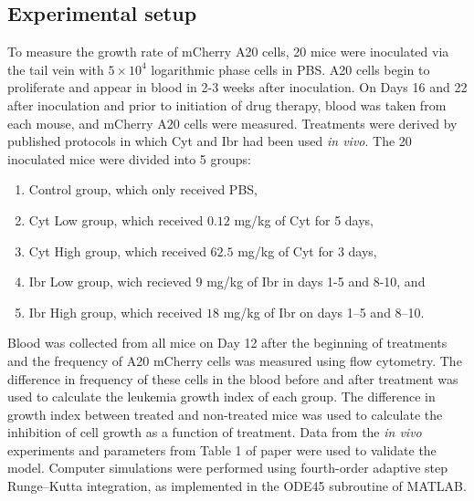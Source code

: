 \subsection{Experimental setup}
To measure the growth rate of mCherry A20 cells, 20 mice were inoculated via the tail vein with $5 \times 10^4$ logarithmic phase cells in PBS. A20 cells begin to proliferate and appear in blood in 2-3 weeks after inoculation.
On Days 16 and 22 after inoculation and prior to initiation of drug therapy, blood was taken from each mouse, and mCherry A20 cells were measured. Treatments were derived by published protocols in which Cyt and Ibr had been used \textit{in vivo}. The 20 inoculated mice were divided into 5 groups: 
\begin{enumerate}
	\item Control group, which only received PBS,
	\item Cyt Low group, which received $0.12$ mg/kg of Cyt for 5 days,
	\item Cyt High group, which received $62.5$ mg/kg of Cyt for 3 days, 
	\item Ibr Low group, wich recieved $9$ mg/kg of Ibr in days 1-5 and 8-10, and
	\item Ibr High group, which received $18$ mg/kg of Ibr on days 1–5 and 8–10. 
\end{enumerate}

Blood was collected from all mice on Day 12 after the beginning of treatments and the frequency of A20 mCherry cells was measured using flow cytometry. The difference in frequency of these cells in the blood before and after treatment was used to calculate the leukemia growth index of each group. The difference in growth index between treated and non-treated mice was used to calculate the inhibition of cell growth as a function of treatment.
Data from the \textit{in vivo} experiments and parameters from Table 1 of paper were used to validate the model. Computer simulations were performed using fourth-order adaptive step Runge–Kutta integration, as implemented in the ODE45 subroutine of MATLAB.
